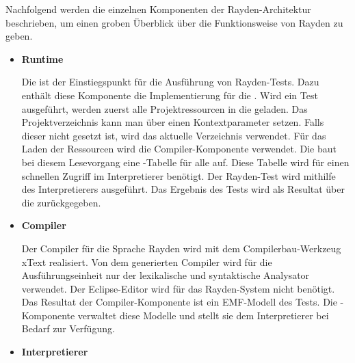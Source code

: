 \SuperPar
Nachfolgend werden die einzelnen Komponenten der Rayden-Architektur beschrieben, um einen groben Überblick über die Funktionsweise von Rayden zu geben.\\

\begin{itemize}

\item \textbf{Runtime}

Die  ist der Einstiegspunkt für die Ausführung von Rayden-Tests. Dazu enthält diese Komponente die Implementierung für die . Wird ein Test ausgeführt, werden zuerst alle Projektressourcen in die  geladen. Das Projektverzeichnis kann man über einen Kontextparameter setzen. Falls dieser nicht gesetzt ist, wird das aktuelle Verzeichnis verwendet. Für das Laden der Ressourcen wird die Compiler-Komponente verwendet. Die  baut bei diesem Lesevorgang eine -Tabelle für alle  auf. Diese Tabelle wird für einen schnellen Zugriff im Interpretierer benötigt. Der Rayden-Test wird mithilfe des Interpretierers ausgeführt. Das Ergebnis des Tests wird als Resultat über die  zurückgegeben.\\

\item \textbf{Compiler}

Der Compiler für die Sprache Rayden wird mit dem Compilerbau-Werkzeug xText \cite{xtext} realisiert. Von dem generierten Compiler wird für die Ausführungseinheit nur der lexikalische und syntaktische Analysator verwendet. Der Eclipse-Editor wird für das Rayden-System nicht benötigt. Das Resultat der Compiler-Komponente ist ein EMF-Modell des Tests. Die -Komponente verwaltet diese Modelle und stellt sie dem Interpretierer bei Bedarf zur Verfügung.\\

\item \textbf{Interpretierer}


\end{itemize}
